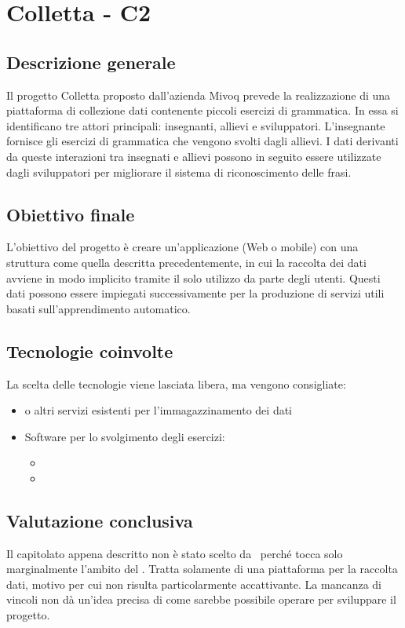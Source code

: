 \section{Colletta - C2} \label{c2}
    \subsection{Descrizione generale}
    Il progetto Colletta proposto dall'azienda Mivoq prevede la realizzazione di una piattaforma di collezione dati contenente piccoli esercizi di grammatica.
    In essa si identificano tre attori principali: insegnanti, allievi e sviluppatori. L'insegnante fornisce gli esercizi di grammatica che vengono svolti dagli allievi.
    I dati derivanti da queste interazioni tra insegnati e allievi possono in seguito essere utilizzate dagli sviluppatori per migliorare il sistema di riconoscimento delle frasi.

    \subsection{Obiettivo finale}
    L'obiettivo del progetto è creare un'applicazione (Web o mobile) con una struttura come quella descritta precedentemente,
    in cui la raccolta dei dati avviene in modo implicito tramite il solo utilizzo da parte degli utenti. Questi dati possono essere impiegati successivamente per la produzione di
    servizi utili basati sull'apprendimento automatico.

    \subsection{Tecnologie coinvolte}
    La scelta delle tecnologie viene lasciata libera, ma vengono consigliate:
        \begin{itemize}
            \item {} o altri servizi esistenti per l'immagazzinamento dei dati
            \item Software  per lo svolgimento degli esercizi:
            \begin{itemize}
                \item {} 
                \item {}
            \end{itemize}
        \end{itemize}

    \subsection{Valutazione conclusiva}
    Il capitolato appena descritto non è stato scelto da \gruppo\ perché tocca solo marginalmente l'ambito del .
    Tratta solamente di una piattaforma per la raccolta dati, motivo per cui non risulta particolarmente accattivante.
    La mancanza di vincoli non dà un'idea precisa di come sarebbe possibile operare per sviluppare il progetto.